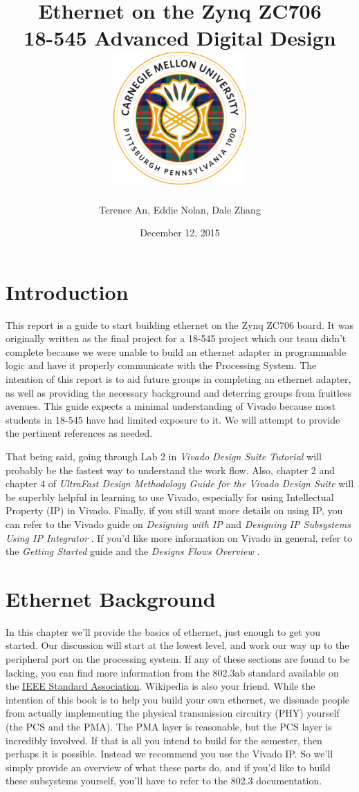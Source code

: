 \documentclass[12pt]{report}
\title{
  {Ethernet on the Zynq ZC706 \vspace{0.2in}}\\
  {\large 18-545 Advanced Digital Design \vspace{0.2in}}\\
  {\includegraphics[width=2in]{cmu_seal.png}}
}
\author{Terence An, Eddie Nolan, Dale Zhang}
\date{December 12, 2015}
\begin{document}
\maketitle

\chapter{Introduction}
This report is a guide to start building ethernet on the Zynq ZC706 board. It was originally written as the final project for a 18-545 project which our team didn't complete because we were unable to build an ethernet adapter in programmable logic and have it properly communicate with the Processing System. The intention of this report is to aid future groups in completing an ethernet adapter, as well as providing the necessary background and deterring groups from fruitless avenues. This guide expects a minimal understanding of Vivado because most students in 18-545 have had limited exposure to it. We will attempt to provide the pertinent references as needed.

That being said, going through Lab 2 in \textit{Vivado Design Suite Tutorial} \cite{vivado_tut} will probably be the fastest way to understand the work flow. Also, chapter 2 and chapter 4 of \textit{UltraFast Design Methodology Guide for the Vivado Design Suite} \cite{ultrafast} will be superbly helpful in learning to use Vivado, especially for using Intellectual Property (IP) in Vivado. Finally, if you still want more details on using IP, you can refer to the Vivado guide on \textit{Designing with IP} \cite{IP} and \textit{Designing IP Subsystems Using IP Integrator} \cite{IP_subsystems}. If you'd like more information on Vivado in general, refer to the \textit{Getting Started} \cite{starter} guide and the \textit{Designs Flows Overview} \cite{design_flows}.

\chapter{Ethernet Background}
In this chapter we'll provide the basics of ethernet, just enough to get you started.
Our discussion will start at the lowest level, and work our way up to the peripheral port on the processing system. If any of these sections are found to be lacking, you can find more information from the 802.3ab standard available on the \href{http://standards.ieee.org/about/get/802/802.3.html}{IEEE Standard Association}. Wikipedia is also your friend.
While the intention of this book is to help you build your own ethernet,
we dissuade people from actually implementing the physical transmission circuitry (PHY) yourself (the PCS and the PMA). The PMA layer is reasonable, but the PCS layer is incredibly involved. If that is all you intend to build for the semester, then perhaps it is possible. Instead we recommend you use the Vivado IP. So we'll simply provide an overview of what these parts do, and if you'd like to build these subsystems yourself, you'll have to refer to the 802.3 documentation.
\end{document}
